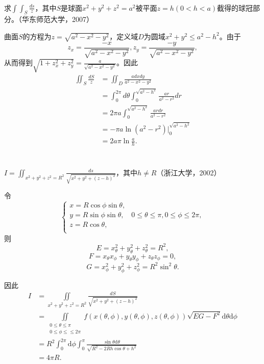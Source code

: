   \begin{exercise}
  \hfill\\
  求$\int\int_S\frac{ds}z$，其中$S$是球面$x^2+y^2+z^2=a^2$被平面$z=h(0<h<a)$截得的球冠部分。（华东师范大学，2007）  
  
   曲面$S$的方程为$z=\sqrt{a^2-x^2-y^2}$，定义域$D$为圆域$x^2+y^2\leq a^2-h^2$。由于$$z_x=\frac{-x}{\sqrt{a^2-x^2-y^2}},z_y=\frac{-y}{\sqrt{a^2-x^2-y^2}},$$
  从而得到$\sqrt{1+z_x^2+z_y^2}=\frac{a}{\sqrt{a^2-x^2-y^2}}$。因此
  \begin{align*}
  \iint_S\frac{dS}{z}&=\iint_D\frac{adxdy}{a^2-x^2-y^2}\\
  &=\int_0^{2\pi}d\theta\int_0^{\sqrt{a^2-h^2}}\frac{ar}{a^2-r^2}dr\\
  &=2\pi a\int_0^{\sqrt{a^2-h^2}}\frac{ardr}{a^2-r^2}\\
  &=-\pi a\ln(a^2-r^2)|_0^{\sqrt{a^2-h^2}}\\
  &=2a\pi\ln\frac{a}{h}.\\
  \end{align*} 
  \end{exercise}
  \begin{exercise}
  \hfill\\
   $I=\iint_{x^2+y^2+z^2=R^2}\frac{ds}{\sqrt{x^2+y^2+(z-h)^2}}$，其中$h\neq R$（浙江大学，2002）
   
  
  令
  \[
	\begin{cases}
	x=R\cos\phi\sin\theta,&\\
	y=R\sin\phi\sin\theta,&0\leq\theta\leq\pi,0\leq\phi\leq2\pi,\\
	z=R\cos\theta,\\
	\end{cases}  
  \]
则$$E=x_{\theta}^2+y_{\theta}^2+z_{\theta}^2=R^2,$$
$$F=x_{\theta}x_{\phi}+y_{\theta}y_{\phi}+z_{\theta}z_{\phi}=0,$$
$$G=x_{\phi}^2+y_{\phi}^2+z_{\phi}^2=R^2\sin^2\theta.$$

因此
\begin{align*}
I&=\iint\limits_{x^2+y^2+z^2=R^2}\frac{dS}{\sqrt{x^2+y^2+(z-h)^2}}\\
&=\iint\limits_{\substack{0\leq\theta\leq\pi\\0\leq\phi\leq\leq2\pi}}f(x(\theta,\phi),y(\theta,\phi),z(\theta,\phi))\sqrt{EG-F^2}\mathrm{d}\theta\mathrm{d}\phi\\
&=R^2\int_0^{2\pi}\mathrm{d}\phi\int_0^{\pi}\frac{\sin\theta\mathrm{d}\theta}{\sqrt{R^2-2Rh\cos\theta+h^2}}\\
&=4\pi R.\\
\end{align*}
 
  \end{exercise}
\hfill\\
